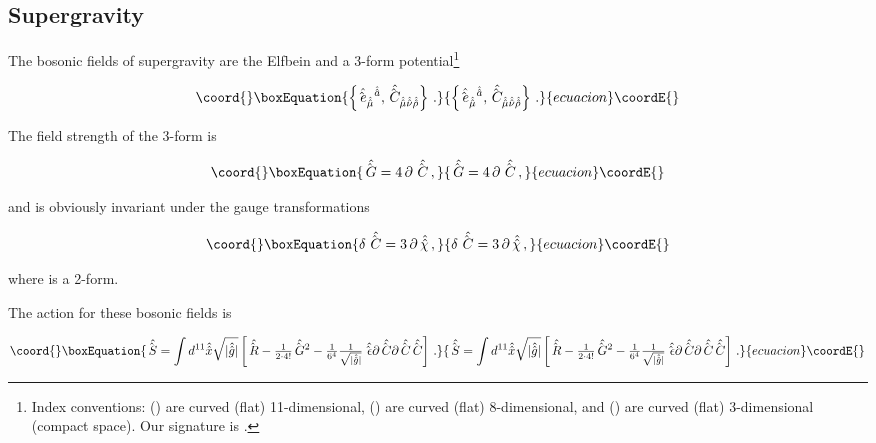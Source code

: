 \documentclass[12pt,a4paper]{article}
\begin{document}
\subsection{\coordHE{} Supergravity}

The bosonic fields of \coordHE{} supergravity are the Elfbein and a
3-form potential\footnote{Index conventions: \myHighlight{$\hat{\hat{\mu}}$}\coordHE{}
  (\coordHE{}) are curved (flat) 11-dimensional, \myHighlight{$\mu$}\coordHE{} (\coordHE{}) are
  curved (flat) 8-dimensional, and \coordHE{} (\coordHE{}) are curved (flat)
  3-dimensional (compact space). Our signature is \myHighlight{$(+-\cdots-)$}\coordHE{}.}

\begin{equation}\coord{}\boxEquation{
\left\{\hat{\hat{e} \,}_{\hat{\hat{\mu}}}{}^{\hat{\hat{a}}},
\hat{\hat{C} \,}_{\hat{\hat{\mu}}\hat{\hat{\nu}}\hat{\hat{\rho}}}
\right\}\, .
}{
\left\{\hat{\hat{e} \,}_{\hat{\hat{\mu}}}{}^{\hat{\hat{a}}},
\hat{\hat{C} \,}_{\hat{\hat{\mu}}\hat{\hat{\nu}}\hat{\hat{\rho}}}
\right\}\, .
}{ecuacion}\coordE{}\end{equation}

\noindent The field strength of the 3-form is

\begin{equation}\coord{}\boxEquation{
\hat{\hat{G} \,} = 4\, \partial\, \hat{\hat{C} \,}\, ,
}{
\hat{\hat{G} \,} = 4\, \partial\, \hat{\hat{C} \,}\, ,
}{ecuacion}\coordE{}\end{equation}

\noindent and is obviously invariant under the gauge transformations

\begin{equation}\coord{}\boxEquation{
\label{eq:3formgauge}
\delta\, \hat{\hat{C} \,}= 3\, \partial\, \hat{\hat{\chi}}\, ,
}{
\delta\, \hat{\hat{C} \,}= 3\, \partial\, \hat{\hat{\chi}}\, ,
}{ecuacion}\coordE{}\end{equation}

\noindent where \myHighlight{$\hat{\hat{\chi}}$}\coordHE{} is a 2-form. 

\noindent The action for these bosonic fields is

\begin{equation}\coord{}\boxEquation{
\label{eq:action11}
 \hat{\hat{S} \,} = 
\int d^{11} \hat{\hat{x}} \sqrt{|\hat{\hat{g}}|}
 \left[ \hat{\hat{R} \,} -{\textstyle\frac{1}{2 \cdot 4!}}
\hat{\hat{G} \,}{}^{2}
 -{\textstyle\frac{1}{6^{4}}}
{\textstyle\frac{1}{\sqrt{|\hat{\hat{g}}|}}}\, \hat{\hat{\epsilon} \,}
\partial\hat{\hat{C} \,}\partial\hat{\hat{C} \,}\hat{\hat{C} \,} \right]\, .
}{
\hat{\hat{S} \,} = 
\int d^{11} \hat{\hat{x}} \sqrt{|\hat{\hat{g}}|}
 \left[ \hat{\hat{R} \,} -{\textstyle\frac{1}{2 \cdot 4!}}
\hat{\hat{G} \,}{}^{2}
 -{\textstyle\frac{1}{6^{4}}}
{\textstyle\frac{1}{\sqrt{|\hat{\hat{g}}|}}}\, \hat{\hat{\epsilon} \,}
\partial\hat{\hat{C} \,}\partial\hat{\hat{C} \,}\hat{\hat{C} \,} \right]\, .
}{ecuacion}\coordE{}\end{equation}
\end{document}
